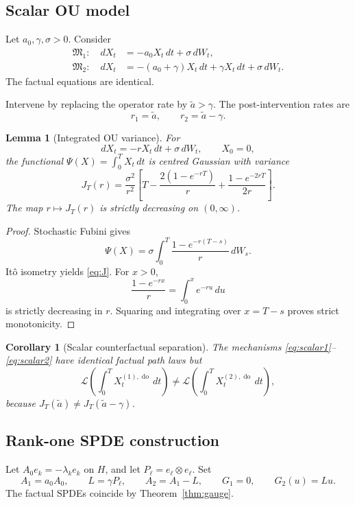 \documentclass[11pt]{article}
\newtheorem{lemma}[assumption]{Lemma}
\newtheorem{corollary}[assumption]{Corollary}
\theoremstyle{remark}
\newcommand{\cM}{\mathfrak M}
\newcommand{\Law}{\mathcal L}
\newcommand{\doop}{\operatorname{do}}
\begin{document}
\subsection{Scalar OU model}

Let $a_0,\gamma,\sigma>0$. Consider
\begin{align}
 \cM_1:\quad
 dX_t&=-a_0X_t\,dt+\sigma\,dW_t,\label{eq:scalar1}\\
 \cM_2:\quad
 dX_t&=-(a_0+\gamma)X_t\,dt+\gamma X_t\,dt+\sigma\,dW_t.\label{eq:scalar2}
\end{align}
The factual equations are identical.

Intervene by replacing the operator rate by $\widetilde a>\gamma$. The post-intervention rates are
\[
 r_1=\widetilde a,
 \qquad
 r_2=\widetilde a-\gamma.
\]

\begin{lemma}[Integrated OU variance]\label{lem:J}
For
\[
 dX_t=-rX_t\,dt+\sigma\,dW_t,
 \qquad X_0=0,
\]
the functional $\Psi(X)=\int_0^T X_t\,dt$ is centred Gaussian with variance
\begin{equation}\label{eq:J}
 J_T(r)
 =
 \frac{\sigma^2}{r^2}
 \left[
 T-\frac{2(1-e^{-rT})}{r}
 +\frac{1-e^{-2rT}}{2r}
 \right].
\end{equation}
The map $r\mapsto J_T(r)$ is strictly decreasing on $(0,\infty)$.
\end{lemma}

\begin{proof}
Stochastic Fubini gives
\[
 \Psi(X)
 =
 \sigma\int_0^T
 \frac{1-e^{-r(T-s)}}{r}\,dW_s.
\]
It\^o isometry yields \eqref{eq:J}. For $x>0$,
\[
 \frac{1-e^{-rx}}{r}
 =
 \int_0^x e^{-ru}\,du
\]
is strictly decreasing in $r$. Squaring and integrating over $x=T-s$ proves strict monotonicity.
\end{proof}

\begin{corollary}[Scalar counterfactual separation]\label{cor:scalar}
The mechanisms \eqref{eq:scalar1}--\eqref{eq:scalar2} have identical factual path laws but
\[
 \Law\!\left(\int_0^T X_t^{(1),\doop}\,dt\right)
 \neq
 \Law\!\left(\int_0^T X_t^{(2),\doop}\,dt\right),
\]
because $J_T(\widetilde a)\neq J_T(\widetilde a-\gamma)$.
\end{corollary}

\subsection{Rank-one SPDE construction}

Let $A_0e_k=-\lambda_ke_k$ on $H$, and let $P_\ell=e_\ell\otimes e_\ell$. Set
\[
 A_1=a_0A_0,
 \qquad
 L=\gamma P_\ell,
 \qquad
 A_2=A_1-L,
 \qquad
 G_1=0,
 \qquad
 G_2(u)=Lu.
\]
The factual SPDEs coincide by Theorem~\ref{thm:gauge}.
\end{document}
